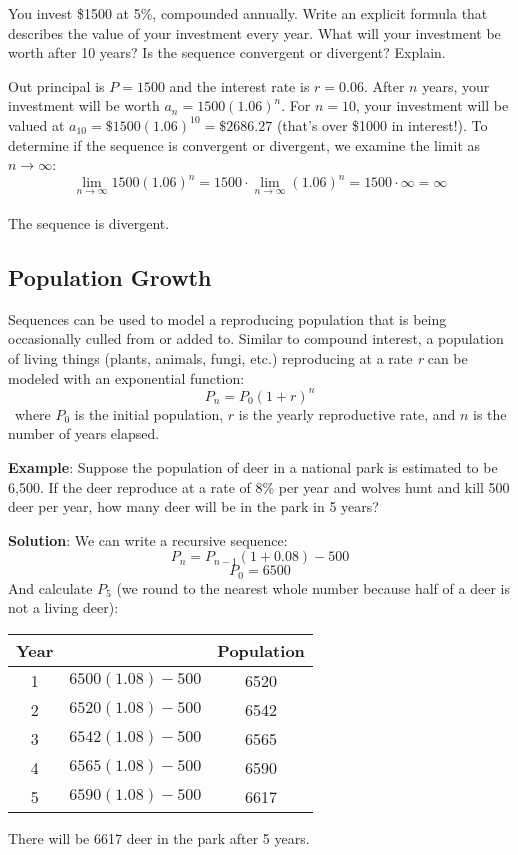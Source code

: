 \begin{Exercise}[label=seqcalc5]
You invest \$1500 at 5\%, compounded annually. Write an explicit formula that 
describes the value of your investment every year. What will your investment 
be worth after 10 years? Is the sequence convergent or divergent? Explain. 
\end{Exercise}

\begin{Answer}[ref=seqcalc5]
Out principal is $P = 1500$ and the interest rate is $r = 0.06$. After $n$ 
years, your investment will be worth $a_n = 1500(1.06)^{n}$. For $n = 10$, 
your investment will be valued at $a_{10} = \$1500(1.06)^{10} = \$2686.27$ 
(that's over \$1000 in interest!). To determine if the sequence is convergent 
or divergent, we examine the limit as $n \to \infty$:
$$\lim_{n \to \infty} 1500(1.06)^n = 1500\cdot \lim_{n \to \infty}
(1.06)^n = 1500 \cdot \infty = \infty$$\\
The sequence is divergent. 
\end{Answer}

\subsection{Population Growth}
Sequences can be used to model a reproducing population that is being 
occasionally culled from or added to. Similar to compound interest, a 
population of living things (plants, animals, fungi, etc.) reproducing at a 
rate \textit{r} can be modeled with an exponential function:
$$P_n = P_0(1+r)^n$$\
where $P_0$ is the initial population, $r$ is the yearly reproductive rate, 
and $n$ is the number of years elapsed. 

\textbf{Example}: Suppose the population of deer in a national park is 
estimated to be 6,500. If the deer reproduce at a rate of 8\% per year and 
wolves hunt and kill 500 deer per year, how many deer will be in the park in 5 
years? 

\textbf{Solution}: We can write a recursive sequence:
$$P_n = P_{n-1}(1 + 0.08) - 500$$
$$P_0 = 6500$$
And calculate $P_5$ (we round to the nearest whole number because half of a 
deer is not a living deer):
\begin{center}
\begin{tabular}{|c|c|c|}\hline
Year & & Population\\
\hline
1 & $6500(1.08) - 500$ & 6520\\
\hline
2 & $6520(1.08) - 500$ & 6542\\
\hline
3 & $6542(1.08) - 500$ & 6565\\
\hline
4 & $6565(1.08) - 500$ & 6590\\
\hline
5 & $6590(1.08) - 500$ & 6617\\
\hline
\end{tabular}
\end{center}
There will be 6617 deer in the park after 5 years. 

